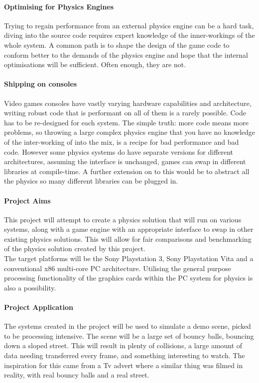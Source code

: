 \documentclass[conference]{acmsiggraph}
\begin{document}
\paragraph{Optimising for Physics Engines}
Trying to regain performance from an external physics engine can be a hard task, diving into the source code requires expert knowledge of the inner-workings of the whole system. A common path is to shape the design of the game code to conform better to the demands of the physics engine and hope that the internal optimisations  will be sufficient. Often enough, they are not.

\paragraph{Shipping on consoles}
Video games consoles have vastly varying hardware capabilities and architecture, writing robust code that is performant on all of them is a rarely possible. Code has to be re-designed for each system. The simple truth: more code means more problems, so throwing a large complex physics engine that you have no knowledge of the inter-working of into the mix, is a recipe for bad performance and bad code. However some physics systems do have separate versions for different architectures, assuming the interface is unchanged, games can swap in different libraries at compile-time. A further extension on to this would be to abstract all the physics so many different libraries can be plugged in.

\paragraph{Project Aims}
This project will attempt to create a physics solution that will run on various systems, along with a game engine with an appropriate interface to swap in other existing physics solutions. This will allow for fair comparisons and benchmarking of the physics solution created by this project.\\
The target platforms will be the Sony Playstation 3, Sony Playstation Vita and a conventional x86 multi-core PC architecture.
Utilising the general purpose processing functionality of the graphics cards within the PC system for physics is also a possibility.

\paragraph{Project Application}
The systems created in the project will be used to simulate a demo scene, picked to be processing intensive. The scene will be a large set of bouncy balls, bouncing down a sloped street. This will result in plenty of collisions, a large amount of data needing transferred every frame, and something interesting to watch. The inspiration for this came from a Tv advert \cite{advert} where a similar thing was filmed in reality, with real bouncy balls and a real street.
\end{document}
